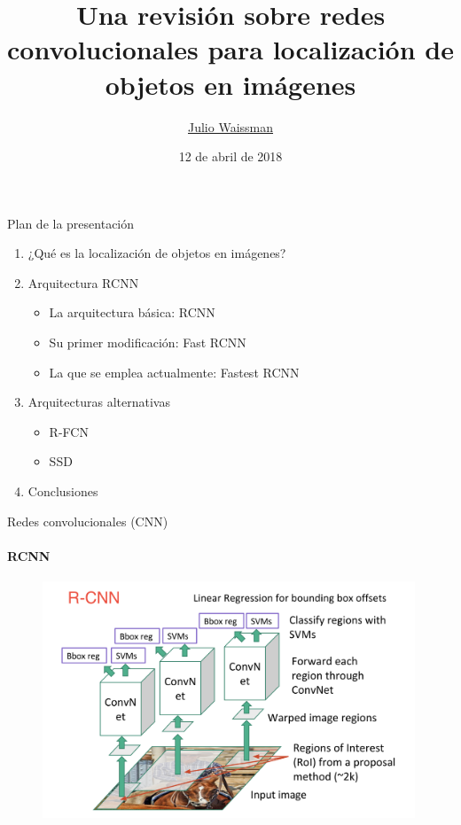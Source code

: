 \documentclass[presentation, t]{beamer}
\author{\href{mailto:julio.waissman@unison.mx}{Julio Waissman}}
\date{12 de abril de 2018}
\title{Una revisión sobre redes convolucionales para localización de objetos en imágenes}
\institute[Unison]{Licenciatura en Ciencias de la Computación\\Universidad de Sonora}
\begin{document}
\maketitle


\begin{frame}[label={sec:org6cf74ba}]{Plan de la presentación}
\begin{enumerate}
\item ¿Qué es la localización de objetos en imágenes?
\item Arquitectura RCNN
\begin{itemize}
\item La arquitectura básica: RCNN
\item Su primer modificación: Fast RCNN
\item La que se emplea actualmente: Fastest RCNN\vfill
\end{itemize}
\item Arquitecturas alternativas
\begin{itemize}
\item R-FCN
\item SSD\vfill
\end{itemize}
\item Conclusiones\vfill
\end{enumerate}
\end{frame}


\begin{frame}[label={sec:orgeb11ad6}]{Redes convolucionales (CNN)}
\framesubtitle{RCNN}

\vfill
\begin{figure}[htbp]
\centering
\includegraphics[width=0.99\textwidth]{./imagenes/rcnn.png}
\end{figure}\vfill
\end{frame}
\end{document}
